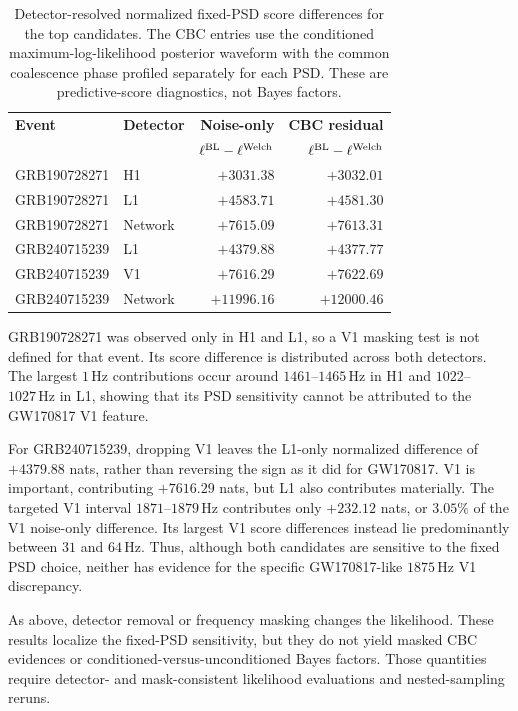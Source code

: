 \begin{table}[ht]
\centering
\small
\caption{Detector-resolved normalized fixed-PSD score differences for the
top candidates. The CBC entries use the conditioned maximum-log-likelihood
posterior waveform with the common coalescence phase profiled separately for
each PSD. These are predictive-score diagnostics, not Bayes factors.}
\label{tab:top-candidate-psd-scores}
\begin{tabular}{llrr}
\toprule
\textbf{Event} & \textbf{Detector} & \textbf{Noise-only}
& \textbf{CBC residual}\\
& & \textbf{$\ell^{\rm BL}-\ell^{\rm Welch}$} &
\textbf{$\ell^{\rm BL}-\ell^{\rm Welch}$}\\
\midrule
GRB190728271 & H1 & $+3031.38$ & $+3032.01$\\
GRB190728271 & L1 & $+4583.71$ & $+4581.30$\\
GRB190728271 & Network & $+7615.09$ & $+7613.31$\\
\addlinespace
GRB240715239 & L1 & $+4379.88$ & $+4377.77$\\
GRB240715239 & V1 & $+7616.29$ & $+7622.69$\\
GRB240715239 & Network & $+11996.16$ & $+12000.46$\\
\bottomrule
\end{tabular}
\end{table}

GRB190728271 was observed only in H1 and L1, so a V1 masking test is not
defined for that event. Its score difference is distributed across both
detectors. The largest $1\,\mathrm{Hz}$ contributions occur around
$1461$--$1465\,\mathrm{Hz}$ in H1 and $1022$--$1027\,\mathrm{Hz}$ in L1,
showing that its PSD sensitivity cannot be attributed to the GW170817 V1
feature.

For GRB240715239, dropping V1 leaves the L1-only normalized difference of
$+4379.88$ nats, rather than reversing the sign as it did for GW170817. V1 is
important, contributing $+7616.29$ nats, but L1 also contributes materially.
The targeted V1 interval $1871$--$1879\,\mathrm{Hz}$ contributes only
$+232.12$ nats, or $3.05\%$ of the V1 noise-only difference. Its largest V1
score differences instead lie predominantly between $31$ and
$64\,\mathrm{Hz}$. Thus, although both candidates are sensitive to the fixed
PSD choice, neither has evidence for the specific GW170817-like
$1875\,\mathrm{Hz}$ V1 discrepancy.

As above, detector removal or frequency masking changes the likelihood.
These results localize the fixed-PSD sensitivity, but they do not yield
masked CBC evidences or conditioned-versus-unconditioned Bayes factors.
Those quantities require detector- and mask-consistent likelihood evaluations
and nested-sampling reruns.

